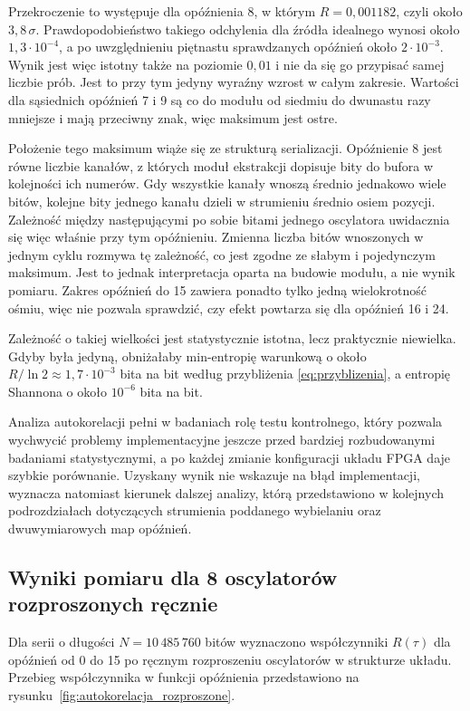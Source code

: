 Przekroczenie to występuje dla opóźnienia 8, w którym $R = 0{,}001182$, czyli
około $3{,}8\,\sigma$. Prawdopodobieństwo takiego odchylenia dla źródła
idealnego wynosi około $1{,}3 \cdot 10^{-4}$, a po uwzględnieniu piętnastu
sprawdzanych opóźnień około $2 \cdot 10^{-3}$. Wynik jest więc istotny także na
poziomie $0{,}01$ i nie da się go przypisać samej liczbie prób. Jest to przy
tym jedyny wyraźny wzrost w całym zakresie. Wartości dla sąsiednich opóźnień
7 i 9 są co do modułu od siedmiu do dwunastu razy mniejsze i mają przeciwny
znak, więc maksimum jest ostre.

Położenie tego maksimum wiąże się ze strukturą serializacji. Opóźnienie 8 jest
równe liczbie kanałów, z których moduł ekstrakcji dopisuje bity do bufora
w kolejności ich numerów. Gdy wszystkie kanały wnoszą średnio jednakowo wiele
bitów, kolejne bity jednego kanału dzieli w strumieniu średnio osiem pozycji.
Zależność między następującymi po sobie bitami jednego oscylatora uwidacznia
się więc właśnie przy tym opóźnieniu. Zmienna liczba bitów wnoszonych w jednym
cyklu rozmywa tę zależność, co jest zgodne ze słabym i pojedynczym
maksimum. Jest to jednak interpretacja oparta na budowie modułu, a nie wynik
pomiaru. Zakres opóźnień do 15 zawiera ponadto tylko jedną wielokrotność ośmiu,
więc nie pozwala sprawdzić, czy efekt powtarza się dla opóźnień 16 i 24.

Zależność o takiej wielkości jest statystycznie istotna, lecz praktycznie
niewielka. Gdyby była jedyną, obniżałaby min-entropię warunkową o około
$R/\ln 2 \approx 1{,}7 \cdot 10^{-3}$ bita na bit według przybliżenia
\eqref{eq:przyblizenia}, a entropię Shannona o około $10^{-6}$ bita na bit.

Analiza autokorelacji pełni w badaniach rolę testu kontrolnego, który pozwala
wychwycić problemy implementacyjne jeszcze przed bardziej rozbudowanymi
badaniami statystycznymi, a po każdej zmianie konfiguracji układu FPGA daje
szybkie porównanie. Uzyskany wynik nie wskazuje na błąd implementacji,
wyznacza natomiast kierunek dalszej analizy, którą przedstawiono w kolejnych
podrozdziałach dotyczących strumienia poddanego wybielaniu oraz
dwuwymiarowych map opóźnień.

\FloatBarrier

\subsection{Wyniki pomiaru dla 8 oscylatorów rozproszonych ręcznie}

Dla serii o długości $N = 10\,485\,760$ bitów wyznaczono współczynniki $R(\tau)$
dla opóźnień od 0 do 15 po ręcznym rozproszeniu oscylatorów w strukturze układu.
Przebieg współczynnika w funkcji opóźnienia przedstawiono na
rysunku~\ref{fig:autokorelacja_rozproszone}.

